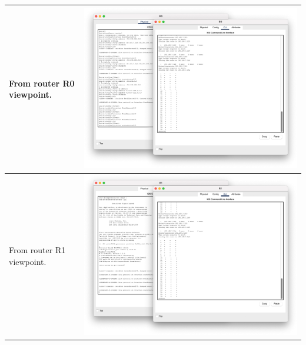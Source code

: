 \documentclass[11pt,a4paper]{report}
\begin{document}
\begin{flushleft}
\begin{center}
\begin{longtable}{ m{5cm} l }
                        From router R0 viewpoint.   & \includegraphics[scale=0.25 ,valign=c]{r0-cliall} \\ \hline
                        From router R1 viewpoint.   & \includegraphics[scale=0.25 ,valign=c]{r1-cliall} \\ \hline

\end{longtable}
\end{center}
\end{flushleft}
\end{document}
